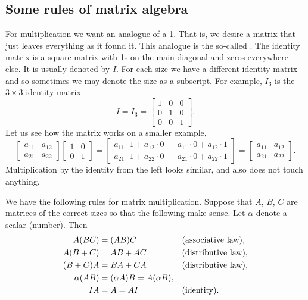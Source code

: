 \subsection{Some rules of matrix algebra}

For multiplication we want an analogue of a 1.  That is,
we desire a matrix that just leaves everything as it found it.
This analogue is the
so-called \emph{}.
The identity matrix is a square matrix with 1s on the
main diagonal and zeros everywhere else.  It is usually denoted by $I$.
For each size we have a different identity matrix and so sometimes we may denote
the size as a subscript.  For example, $I_3$ is the $3 \times 3$
identity matrix
\begin{equation*}
I = I_3 =
\begin{bmatrix}
1 & 0 & 0 \\
0 & 1 & 0 \\
0 & 0 & 1
\end{bmatrix} .
\end{equation*}
Let us see how the matrix works on a smaller example,
\begin{equation*}
\begin{bmatrix}
a_{11} & a_{12} \\
a_{21} & a_{22} 
\end{bmatrix}
\begin{bmatrix}
1 & 0 \\
0 & 1
\end{bmatrix} =
\begin{bmatrix}
a_{11} \cdot 1 + a_{12} \cdot 0
& &
a_{11} \cdot 0 + a_{12} \cdot 1
\\
a_{21} \cdot 1 + a_{22} \cdot 0
& &
a_{21} \cdot 0 + a_{22} \cdot 1
\end{bmatrix}
=
\begin{bmatrix}
a_{11} & a_{12} \\
a_{21} & a_{22} 
\end{bmatrix} .
\end{equation*}
Multiplication by the identity from the left looks similar, and also
does not touch anything.

\medskip

We have the following rules for matrix multiplication.  Suppose that
$A$, $B$, $C$ are matrices of the correct sizes so that the following
make sense.  Let $\alpha$ denote a scalar (number).  Then
\begin{align*}
A(BC) & = (AB)C & & \text{(\myindex{associative law})} , \\
A(B+C) & = AB + AC & & \text{(\myindex{distributive law})} , \\
(B+C)A & = BA + CA & & \text{(distributive law)} , \\
\alpha(AB) & = (\alpha A)B = A(\alpha B) , & &  \\
IA & = A = AI & & \text{(identity)}.
\end{align*}

